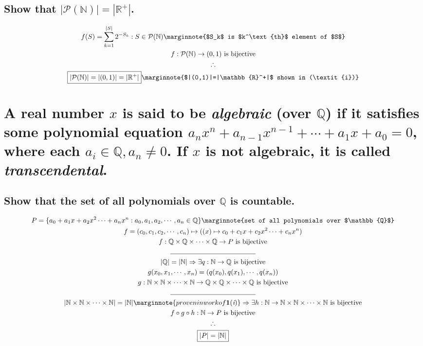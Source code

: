 \documentclass[letterpaper]{article}
\begin{document}
\subsection{Show that $|\mathcal{P}(\mathbb{N})|=|\mathbb{R}^+|$.}
\begin{gather*}
f(S)=\sum_{k=1}^{|S|}2^{-S_k}: S\in\mathcal{P}(\mathbb{N}) \marginnote{$S_k$ is $k^\text{th}$ element of $S$} \\
f:\mathcal{P}(\mathbb{N})\rightarrow (0,1) \text{ is bijective} \\
\therefore \\
\boxed{|\mathcal{P}(\mathbb{N})|=|(0,1)|=|\mathbb{R}^+|} \marginnote{$|(0,1)|=|\mathbb{R}^+|$ shown in (\textit{i})}
\end{gather*}

\section{A real number $x$ is said to be \textit{algebraic} (over $\mathbb{Q}$) if it satisfies some polynomial equation $a_nx^n+a_{n-1}x^{n-1}+\dotsb+a_1x+a_0=0$, where each $a_i\in\mathbb{Q},a_n\neq0$. If $x$ is not algebraic, it is called \textit{transcendental}.}
\subsection{Show that the set of all polynomials over $\mathbb{Q}$ is countable.}
\begin{gather*}
P=\{a_0+a_1x+a_2x^2\dotsb+a_nx^n:a_0,a_1,a_2,\dotsb,a_n\in\mathbb{Q}\} \marginnote{set of all polynomials over $\mathbb{Q}$} \\
f=(c_0,c_1,c_2,\dotsb,c_n)\mapsto((x)\mapsto c_0+c_1x+c_2x^2\dotsb+c_nx^n) \\
f: \mathbb{Q}\times\mathbb{Q}\times\dotsb\times\mathbb{Q}\rightarrow P \text{ is bijective} \\
\line(1, 0){125} \\
|\mathbb{Q}|=|\mathbb{N}|\Rightarrow\exists q:\mathbb{N}\rightarrow\mathbb{Q}\text{ is bijective} \\
g(x_0,x_1,\dotsb,x_n)=(q(x_0),q(x_1),\dotsb,q(x_n)) \\
g:\mathbb{N}\times\mathbb{N}\times\dotsb\times\mathbb{N}\rightarrow\mathbb{Q}\times\mathbb{Q}\times\dotsb\times\mathbb{Q}\text{ is bijective} \\
\line(1, 0){125} \\
|\mathbb{N}\times\mathbb{N}\times\dotsb\times\mathbb{N}|=|\mathbb{N}| \marginnote{proven in work of \textbf{1}(\textit{i})} \Rightarrow \exists h:\mathbb{N}\rightarrow\mathbb{N}\times\mathbb{N}\times\dotsb\times\mathbb{N}\text{ is bijective} \\
f\circ g\circ h:\mathbb{N}\rightarrow P\text{ is bijective} \\
\therefore \\
\boxed{|P|=|\mathbb{N}|}
\end{gather*}
\end{document}
